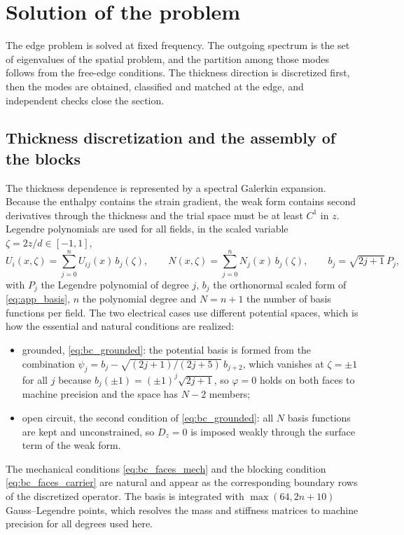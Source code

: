 \section{Solution of the problem}
\label{sec:numerics}

The edge problem is solved at fixed frequency.  The outgoing spectrum is the set of eigenvalues of the spatial problem, and the partition among those modes follows from the free-edge conditions.  The thickness direction is discretized first, then the modes are obtained, classified and matched at the edge, and independent checks close the section.

\subsection{Thickness discretization and the assembly of the blocks}
\label{sec:numerics_basis}

The thickness dependence is represented by a spectral Galerkin expansion.
Because the enthalpy contains the strain gradient, the weak form contains second
derivatives through the thickness and the trial space must be at least $C^1$ in
$z$.  Legendre polynomials are used for all fields, in the scaled variable
$\zeta=2z/d\in[-1,1]$,
\begin{equation}
\label{eq:basis}
U_i(x,\zeta)=\sum_{j=0}^{n}U_{ij}(x)\,b_j(\zeta),\qquad
N(x,\zeta)=\sum_{j=0}^{n}N_{j}(x)\,b_j(\zeta),\qquad
b_j=\sqrt{2j+1}\,P_j ,
\end{equation}
with $P_j$ the Legendre polynomial of degree $j$, $b_j$ the orthonormal scaled form of \eqref{eq:app_basis}, $n$ the polynomial degree and $N=n+1$ the number of basis functions per field.  The two electrical cases use different potential spaces,
which is how the essential and natural conditions are realized:
\begin{itemize}
\item grounded, \eqref{eq:bc_grounded}: the potential basis is formed from the
combination $\psi_j=b_j-\sqrt{(2j+1)/(2j+5)}\,b_{j+2}$, which vanishes at
$\zeta=\pm1$ for all $j$ because $b_j(\pm1)=(\pm1)^{j}\sqrt{2j+1}$, so $\varphi=0$ holds on both faces to machine precision and the
space has $N-2$ members;
\item open circuit, the second condition of \eqref{eq:bc_grounded}: all $N$
basis functions are kept and unconstrained, so $D_z=0$ is imposed weakly through
the surface term of the weak form.
\end{itemize}
The mechanical conditions \eqref{eq:bc_faces_mech} and the blocking condition
\eqref{eq:bc_faces_carrier} are natural and appear as the corresponding boundary
rows of the discretized operator.  The basis is integrated with
$\max(64,2n+10)$ Gauss--Legendre points, which resolves the mass and stiffness
matrices to machine precision for all degrees used here.

